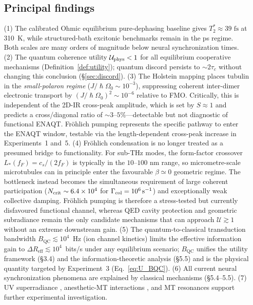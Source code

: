 \documentclass[twocolumn,10pt]{article}
\renewcommand{\hbar}{\hslash}
\newcommand{\fs}{\text{~fs}}
\begin{document}
\subsection{Principal findings}
(1) The calibrated Ohmic equilibrium pure-dephasing baseline gives
\(T_2^*\approx39\fs\) at 310~K, while structured-bath excitonic benchmarks
remain in the ps regime. Both scales are many orders of magnitude below
neural synchronization times.
(2) The quantum coherence utility $\mathcal{U}_{\rm phys} < 1$ for all equilibrium
cooperative mechanisms (Definition~\ref{def:utility}); quantum discord
persists to $\sim 2\tau_c$ without changing this conclusion
(\S\ref{sec:discord}).
(3) The Holstein mapping places tubulin in the \emph{small-polaron regime}
($J/\hbar\Omega_0 \sim 10^{-3}$), suppressing coherent inter-dimer
electronic transport by $(J/\hbar\Omega_0)^2 \sim 10^{-6}$ relative to
FMO. Critically, this is independent of the 2D-IR cross-peak amplitude,
which is set by $S \approx 1$ and predicts a cross/diagonal ratio of
$\sim 3$--$5\%$---detectable but not diagnostic of functional ENAQT.
Fr\"ohlich pumping represents the specific pathway to enter the ENAQT
window, testable via the length-dependent cross-peak increase in
Experiments~1 and~5.
(4) Fr\"ohlich condensation is no longer treated as a presumed bridge to
functionality. For sub-THz modes, the form-factor crossover
\(L_*(f_F)=c_s/(2f_F)\) is typically in the \(10\)--\(100\) nm range, so
micrometre-scale microtubules can in principle enter the favourable
\(\beta\simeq0\) geometric regime. The bottleneck instead becomes the
simultaneous requirement of large coherent participation
(\(N_{\rm crit}\sim6.4\times10^4\) for
\(\Gamma_{\rm col}=10^6\,{\rm s}^{-1}\)) and exceptionally weak collective
damping. Fr\"ohlich pumping is therefore a stress-tested but currently
disfavoured functional channel, whereas QED cavity protection and geometric
subradiance remain the only candidate mechanisms that can approach
\(\mathcal{U}\gtrsim1\) without an extreme downstream gain.
(5) The quantum-to-classical transduction bandwidth $B_{\text{QC}}
\lesssim 10^4$~Hz (ion channel kinetics) limits the effective information
gain to $\Delta R_{\text{eff}} \lesssim 10^4$~bits/s under any equilibrium
scenario; $B_{\text{QC}}$ unifies the utility framework (\S 3.4) and the
information-theoretic analysis (\S 5.5) and is the physical quantity
targeted by Experiment~3 (Eq.~\ref{eq:U_BQC}).
(6) All current neural synchronization phenomena are explained by
classical mechanisms (\S 5.4--5.5).
(7) UV superradiance \cite{Babcock2024}, anesthetic-MT interactions
\cite{Khan2024,Kalra2023}, and MT resonances \cite{Saxena2020,Singh2021}
support further experimental investigation.
\end{document}
